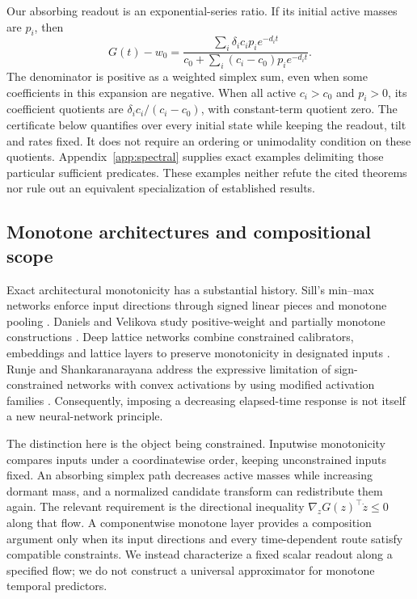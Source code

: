 Our absorbing readout is an exponential-series ratio. If its initial active masses are $p_i$, then
\begin{equation}\label{eq:spectral}
G(t)-w_0=
\frac{\sum_i\delta_i c_i p_i e^{-d_it}}
{c_0+\sum_i(c_i-c_0)p_i e^{-d_it}}.
\end{equation}
The denominator is positive as a weighted simplex sum, even when some coefficients in this expansion are negative. When all active $c_i>c_0$ and $p_i>0$, its coefficient quotients are $\delta_i c_i/(c_i-c_0)$, with constant-term quotient zero. The certificate below quantifies over every initial state while keeping the readout, tilt and rates fixed. It does not require an ordering or unimodality condition on these quotients. Appendix~\ref{app:spectral} supplies exact examples delimiting those particular sufficient predicates. These examples neither refute the cited theorems nor rule out an equivalent specialization of established results.

\subsection{Monotone architectures and compositional scope}
Exact architectural monotonicity has a substantial history. Sill's min--max networks enforce input directions through signed linear pieces and monotone pooling \cite{sill}. Daniels and Velikova study positive-weight and partially monotone constructions \cite{daniels}. Deep lattice networks combine constrained calibrators, embeddings and lattice layers to preserve monotonicity in designated inputs \cite{lattice}. Runje and Shankaranarayana address the expressive limitation of sign-constrained networks with convex activations by using modified activation families \cite{runje}. Consequently, imposing a decreasing elapsed-time response is not itself a new neural-network principle.

The distinction here is the object being constrained. Inputwise monotonicity compares inputs under a coordinatewise order, keeping unconstrained inputs fixed. An absorbing simplex path decreases active masses while increasing dormant mass, and a normalized candidate transform can redistribute them again. The relevant requirement is the directional inequality $\nabla_zG(z)^\top\dot z\le0$ along that flow. A componentwise monotone layer provides a composition argument only when its input directions and every time-dependent route satisfy compatible constraints. We instead characterize a fixed scalar readout along a specified flow; we do not construct a universal approximator for monotone temporal predictors.

